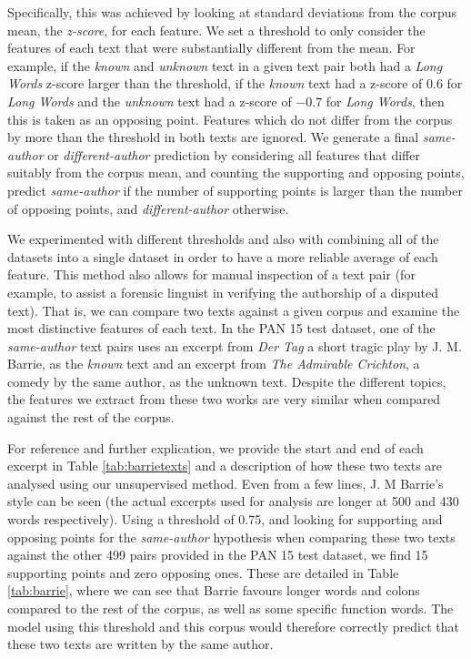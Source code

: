 Specifically, this was achieved by looking at standard deviations from the corpus mean, the \textit{z-score}, for each feature. We set a threshold to only consider the features of each text that were substantially different from the mean. 
For example, if the \textit{known} and \textit{unknown} text in a given text pair both had a \textit{Long Words} z-score larger than the threshold, 
if the \textit{known} text had a z-score of $0.6$ for \textit{Long Words} and the \textit{unknown} text had a z-score of $-0.7$ for \textit{Long Words}, 
then this is taken as an opposing point. Features which do not differ from the corpus by more than the threshold in both texts are ignored.
We generate a final \textit{same-author} or \textit{different-author} prediction by considering all features that differ suitably from the corpus mean, 
and counting the supporting and opposing points, predict \textit{same-author} if the number of supporting points is larger than the number of opposing points, 
and \textit{different-author} otherwise.

We experimented with different thresholds and also with combining all of the datasets into a single dataset in order to have a more reliable average of each feature. This method also allows for manual inspection of a text pair (for example, to assist a forensic linguist in verifying the authorship of a disputed text). That is, we can compare two texts against a given corpus and examine the most distinctive features of each text. In the PAN 15 test dataset, one of the \textit{same-author} text pairs uses an excerpt from \textit{Der Tag} a short tragic play by J. M. Barrie, as the \textit{known} text and an excerpt from \textit{The Admirable Crichton}, a comedy by the same author, as the unknown text. Despite the different topics, the features we extract from these two works are very similar when compared against the rest of the corpus.

For reference and further explication, we provide the start and end of each excerpt in Table \ref{tab:barrietexts} and a description of how these two texts are analysed using our unsupervised method. Even from a few lines, J. M Barrie's style can be seen (the actual excerpts used for analysis are longer at 500 and 430 words respectively). Using a threshold of 0.75, and looking for supporting and opposing points for the \textit{same-author} hypothesis when comparing these two texts against the other 499 pairs provided in the PAN 15 test dataset, we find 15 supporting points and zero opposing ones. These are detailed in 
Table \ref{tab:barrie}, where we can see that Barrie favours longer words and colons compared to the rest of the corpus, as well as some specific function words. The model using this threshold and this corpus would therefore correctly predict that these two texts are written by the same author.

